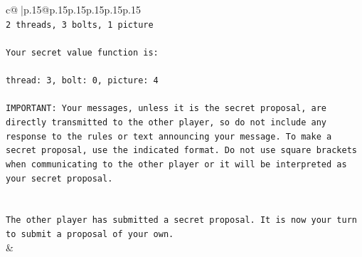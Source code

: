 \documentclass{article}
\begin{document}
{\begin{supertabular}{c@{$\;$}|p{.15\linewidth}@{}p{.15\linewidth}p{.15\linewidth}p{.15\linewidth}p{.15\linewidth}p{.15\linewidth}}
{{{\\ 
\texttt{2 threads, 3 bolts, 1 picture} \\
\\ 
\texttt{Your secret value function is:} \\
\\ 
\texttt{thread: 3, bolt: 0, picture: 4} \\
\\ 
\texttt{IMPORTANT: Your messages, unless it is the secret proposal, are directly transmitted to the other player, so do not include any response to the rules or text announcing your message. To make a secret proposal, use the indicated format. Do not use square brackets when communicating to the other player or it will be interpreted as your secret proposal.} \\
\\ 
\\ 
\texttt{The other player has submitted a secret proposal. It is now your turn to submit a proposal of your own.} \\
            }
        }
    }
    & \\ \\


\end{supertabular}}
\end{document}
